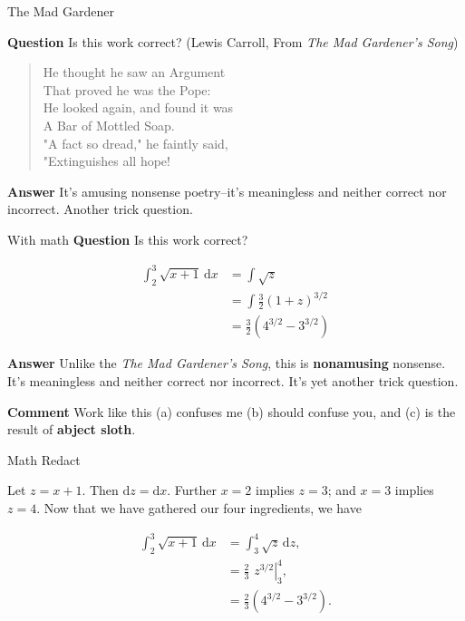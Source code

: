 \documentclass[fleqn]{beamer}
\theoremstyle{definition}
\begin{document}
\begin{frame}{The Mad Gardener}

  \textbf{Question} Is this work correct? 
   (Lewis Carroll, From \emph{The Mad Gardener’s Song})

   \vspace{0.5in}
  \begin{quote}
    He thought he saw an Argument\\
  That proved he was the Pope:\\
  He looked again, and found it was\\
  A Bar of Mottled Soap.\\
  "A fact so dread," he faintly said,\\
  "Extinguishes all hope! 
  \end{quote}
 
  \vspace{0.25in}
  \textbf{Answer} It's amusing nonsense poetry--it's meaningless
  and neither correct nor incorrect. Another trick question.
  
\end{frame}

\begin{frame}{With math}
  \textbf{Question} Is this work correct? 

  \begin{align*}
    \int_2^3 \sqrt{x+1} \, \mathrm{d}x &=  \int\sqrt{z}\\
                                       &= \int \frac{3}{2} (1+ z)^{3/2}\\
                                       &=  \frac{3}{2} (4^{3/2} - 3^{3/2})
  \end{align*}

  \textbf{Answer} Unlike the \emph{The Mad Gardener’s Song}, this is 
  \textbf{nonamusing} nonsense. It's 
  meaningless and neither correct nor incorrect. It's yet another 
  trick question.

  \textbf{Comment} Work like this (a) confuses me (b) should 
  confuse you, and (c) is the result of \textbf{abject sloth}.
\end{frame}

\begin{frame}{Math Redact}

  Let $z = x+1$. Then $\mathrm{d}z = \mathrm{d}x$. Further
  $x=2$ implies $z=3$; and $x=3$ implies $z=4$. Now that we
  have gathered our four ingredients, we have

\begin{align*}
    \int_2^3 \sqrt{x+1} \, \mathrm{d}x &=  \int_3^4 \sqrt{z} \, \mathrm{d} z,\\
                                       &=  \left. \frac{2}{3} \, \,  z^{3/2} \right |_{3}^4, \\
                                       &= \frac{2}{3} \left(4^{3/2} - 3^{3/2}\right).
  \end{align*}
\end{frame}
\end{document}
